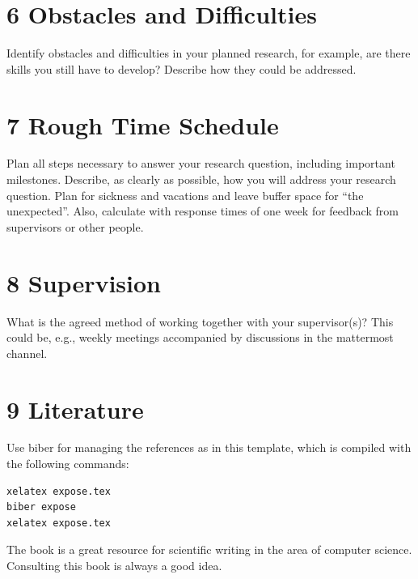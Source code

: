\documentclass[a4paper,11pt]{article}
\begin{document}
\section*{6 Obstacles and Difficulties}
Identify obstacles and difficulties in your planned research, for example, are there skills you still have to develop? Describe how they could be addressed.

\section*{7 Rough Time Schedule}
Plan all steps necessary to answer your research question, including important milestones. Describe, as clearly as possible, how you will address your research question. Plan for sickness and vacations and leave buffer space for “the unexpected”. Also, calculate with response times of one week for feedback from supervisors or other people.

\section*{8 Supervision}
What is the agreed method of working together with your supervisor(s)? This could be, e.g., weekly meetings accompanied by discussions in the mattermost channel.

\section*{9 Literature}
Use biber for managing the references as in this template, which is compiled with the following commands:
\begin{verbatim}
xelatex expose.tex
biber expose
xelatex expose.tex
\end{verbatim}
The book \cite{zobel2015} is a great resource for scientific writing in the area of computer science. Consulting this book is always a good idea.

\printbibliography[title=References]
\end{document}

